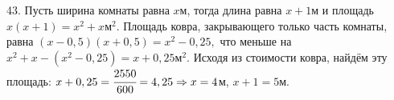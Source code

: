 43. Пусть ширина комнаты равна $x$м, тогда длина равна $x+1$м и площадь $x(x+1)=x^2+x\text{м}^2.$ Площадь ковра, закрывающего только часть комнаты, равна $(x-0,5)(x+0,5)=x^2-0,25,$ что меньше на $x^2+x-(x^2-0,25)=x+0,25\text{м}^2.$ Исходя из стоимости ковра, найдём эту площадь: $x+0,25=\cfrac{2550}{600}=4,25\Rightarrow x=4$м, $x+1=5$м.\\
